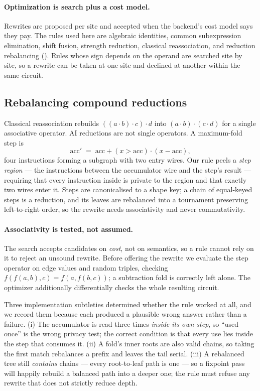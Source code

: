 \documentclass[11pt]{article}
\begin{document}
\paragraph{Optimization is search plus a cost model.} Rewrites are proposed
per site and accepted when the backend's cost model says they pay. The rules
used here are algebraic identities, common subexpression elimination, shift
fusion, strength reduction, classical reassociation, and reduction
rebalancing (). Rules whose sign depends on the operand are
searched site by site, so a rewrite can be taken at one site and declined at
another within the same circuit.

\subsection{Rebalancing compound reductions}\label{sec:reassoc}

Classical reassociation rebuilds $((a\cdot b)\cdot c)\cdot d$ into
$(a\cdot b)\cdot(c\cdot d)$ for a single associative operator. AI reductions
are not single operators. A maximum-fold step is
\[
\mathrm{acc}' \;=\; \mathrm{acc} + (x > \mathrm{acc})\cdot(x - \mathrm{acc}),
\]
four instructions forming a subgraph with two entry wires. Our rule peels a
\emph{step region} --- the instructions between the accumulator wire and the
step's result --- requiring that every instruction inside is private to the
region and that exactly two wires enter it. Steps are canonicalised to a shape
key; a chain of equal-keyed steps is a reduction, and its leaves are
rebalanced into a tournament preserving left-to-right order, so the rewrite
needs associativity and never commutativity.

\paragraph{Associativity is tested, not assumed.} The search accepts
candidates on \emph{cost}, not on semantics, so a rule cannot rely on it to
reject an unsound rewrite. Before offering the rewrite we evaluate the step
operator on edge values and random triples, checking $f(f(a,b),c) = f(a,f(b,c))$;
a subtraction fold is correctly left alone. The optimizer additionally
differentially checks the whole resulting circuit.

Three implementation subtleties determined whether the rule worked at all, and
we record them because each produced a plausible wrong answer rather than a
failure. (i) The accumulator is read three times \emph{inside its own step},
so ``used once'' is the wrong privacy test; the correct condition is that
every use lies inside the step that consumes it. (ii) A fold's inner roots are
also valid chains, so taking the first match rebalances a prefix and leaves
the tail serial. (iii) A rebalanced tree still \emph{contains} chains --- every
root-to-leaf path is one --- so a fixpoint pass will happily rebuild a
balanced path into a deeper one; the rule must refuse any rewrite that does
not strictly reduce depth.
\end{document}
